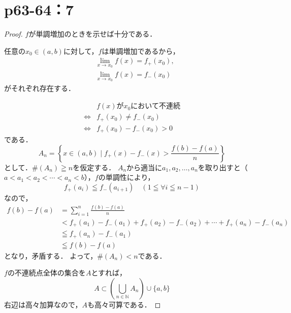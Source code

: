 \documentclass[a4paper,10pt,fleqn]{ltjsarticle}
\begin{document}
    \section*{p63-64：7}
    \begin{leftbar}
    \begin{proof} $f$が単調増加のときを示せば十分である．
    
      任意の$ x_0 \in (a,b)$に対して，$f$は単調増加であるから，
      \begin{align*} 
        &\lim_{x \to x_0} f(x)=f_{+} (x_0) , \\
        &\lim_{x \to x_0} f(x)=f_{-} (x_0)
      \end{align*} 
      がそれぞれ存在する．
    
      \begin{align*} 
       & \text{$f(x)$が$x_0$において不連続} \\
       \iff & f_{+} (x_0) \ne f_{-} (x_0) \\
        \iff & f_{+} (x_0) - f_{-} (x_0)>0 
      \end{align*} 
      である．
      \[
      A_n =  \left \{ x \in (a,b) \mid f_{+} (x) - f_{-} (x) > \frac{f(b)-f(a)}{n} \right \}
      \]
      として．$\# (A_n) \geqq n$を仮定する．
      $A_n$から適当に$a_1,a_2,\ldots,a_n$を取り出すと（$a<a_1 < a_2 < \cdots < a_n<b$），$f$の単調性により，
      \[
      f_{+} (a_i) \leqq f_{-} (a_{i+1}) \quad (1 \leqq \forall i \leqq n-1)
      \]
      なので，
      \begin{align*} 
        f(b)-f(a) &= \sum_{i=1}^{n} \frac{f(b)-f(a)}{n} \\
        & < f_{+} (a_1) - f_{-} (a_1) + f_{+} (a_2) - f_{-} (a_2) + \cdots + f_{+} (a_n) - f_{-} (a_n) \\
        & \leqq f_{+} (a_n) - f_{-} (a_1) \\
        & \leqq f(b)-f(a)
      \end{align*}
      となり，矛盾する．
      よって，$\# (A_n) < n$である．
    
      $f$の不連続点全体の集合を$A$とすれば，
      \[
      A \subset \left ( \bigcup_{n \in \mathbb{N}}  A_n \right ) \cup \{ a, b \}
      \]
      右辺は高々加算なので，$A$も高々可算である．
    \end{proof}
    \end{leftbar}
    
\end{document}

